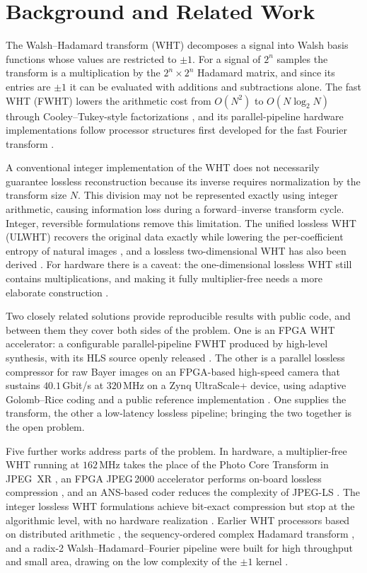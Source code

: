 \documentclass[conference]{IEEEtran}
\begin{document}
\section{Background and Related Work}

The Walsh--Hadamard transform (WHT) decomposes a signal into Walsh basis functions
whose values are restricted to $\pm 1$. For a signal of $2^n$ samples the transform is
a multiplication by the $2^n \times 2^n$ Hadamard matrix, and since its entries are
$\pm 1$ it can be evaluated with additions and subtractions alone. The fast WHT (FWHT)
lowers the arithmetic cost from $O(N^2)$ to $O(N\log_2 N)$ through Cooley--Tukey-style
factorizations \cite{manjarres2021}, and its parallel-pipeline hardware implementations
follow processor structures first developed for the fast Fourier transform
\cite{wold1984}.

A conventional integer implementation of the WHT does not necessarily guarantee
lossless reconstruction because its inverse requires normalization by the transform
size $N$. This division may not be represented exactly using integer arithmetic,
causing information loss during a forward--inverse transform cycle. Integer, reversible formulations remove this limitation. The unified lossless
WHT (ULWHT) recovers the original data exactly while lowering the per-coefficient
entropy of natural images \cite{jung1997}, and a lossless two-dimensional WHT has also
been derived \cite{komatsu2001}. For hardware there is a caveat: the one-dimensional
lossless WHT still contains multiplications, and making it fully multiplier-free needs a
more elaborate construction \cite{komatsu2001}.

Two closely related solutions provide reproducible results with public code, and between
them they cover both sides of the problem. One is an FPGA WHT accelerator: a
configurable parallel-pipeline FWHT produced by high-level synthesis, with its HLS
source openly released \cite{manjarres2021}. The other is a parallel lossless compressor
for raw Bayer images on an FPGA-based high-speed camera that sustains $40.1$\,Gbit/s at
$320$\,MHz on a Zynq UltraScale+ device, using adaptive Golomb--Rice coding and a public
reference implementation \cite{regorsek2024}. One supplies the transform, the other a
low-latency lossless pipeline; bringing the two together is the open problem.

Five further works address parts of the problem. In hardware, a multiplier-free WHT
running at $162$\,MHz takes the place of the Photo Core Transform in JPEG~XR
\cite{hafizullah2018}, an FPGA JPEG\,2000 accelerator performs on-board lossless
compression \cite{ghodhbani2024}, and an ANS-based coder reduces the complexity of
JPEG-LS \cite{alonso2021}. The integer lossless WHT formulations achieve bit-exact
compression but stop at the algorithmic level, with no hardware realization
\cite{jung1997,komatsu2001}. Earlier WHT processors based on distributed arithmetic
\cite{amira2007}, the sequency-ordered complex Hadamard transform \cite{bi2008}, and a
radix-2 Walsh--Hadamard--Fourier pipeline \cite{liu2015} were built for high throughput
and small area, drawing on the low complexity of the $\pm 1$ kernel \cite{nayak2022}.
\end{document}
